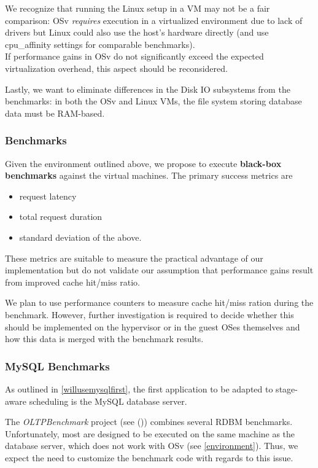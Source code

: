 \documentclass{article}
\begin{document}
We recognize that running the Linux setup in a VM may not be a fair comparison:
OSv \emph{requires} execution in a virtualized environment due to lack of drivers
but Linux could also use the host's hardware directly (and use cpu\_affinity settings for comparable benchmarks).\\
If performance gains in OSv do not significantly exceed the expected virtualization overhead, this aspect should be reconsidered.

Lastly, we want to eliminate differences in the Disk IO subsystems from the benchmarks:
in both the OSv and Linux VMs, the file system storing database data must be RAM-based.

\subsubsection{Benchmarks}

Given the environment outlined above, we propose to execute \textbf{black-box benchmarks} against the virtual machines.
The primary success metrics are
\begin{itemize}
    \item request latency
    \item total request duration
    \item standard deviation of the above.
\end{itemize}

These metrics are suitable to measure the practical advantage of our implementation but
do not validate our assumption that performance gains result from improved cache hit/miss ratio.

We plan to use performance counters to measure cache hit/miss ration during the benchmark.
However, further investigation is required to decide whether this should be implemented on the hypervisor or in the guest OSes themselves
and how this data is merged with the benchmark results.

\subsubsection{MySQL Benchmarks}

As outlined in \ref{willusemysqlfirst}, the first application to be adapted to stage-aware scheduling is the MySQL database server.

The \textit{OLTPBenchmark} project (see (\cite{oltpbench})) combines several RDBM benchmarks.
Unfortunately, most are designed to be executed on the same machine as the database server, which does not work with OSv (see \ref{environment}).
Thus, we expect the need to customize the benchmark code with regards to this issue.
\end{document}
